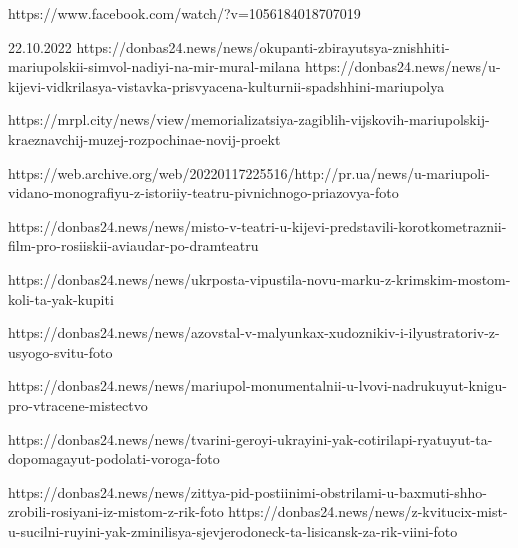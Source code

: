  
 
 
 
 

https://www.facebook.com/watch/?v=1056184018707019

22.10.2022
https://donbas24.news/news/okupanti-zbirayutsya-znishhiti-mariupolskii-simvol-nadiyi-na-mir-mural-milana
https://donbas24.news/news/u-kijevi-vidkrilasya-vistavka-prisvyacena-kulturnii-spadshhini-mariupolya

https://mrpl.city/news/view/memorializatsiya-zagiblih-vijskovih-mariupolskij-kraeznavchij-muzej-rozpochinae-novij-proekt

https://web.archive.org/web/20220117225516/http://pr.ua/news/u-mariupoli-vidano-monografiyu-z-istoriiy-teatru-pivnichnogo-priazovya-foto

https://donbas24.news/news/misto-v-teatri-u-kijevi-predstavili-korotkometraznii-film-pro-rosiiskii-aviaudar-po-dramteatru

https://donbas24.news/news/ukrposta-vipustila-novu-marku-z-krimskim-mostom-koli-ta-yak-kupiti

https://donbas24.news/news/azovstal-v-malyunkax-xudoznikiv-i-ilyustratoriv-z-usyogo-svitu-foto

https://donbas24.news/news/mariupol-monumentalnii-u-lvovi-nadrukuyut-knigu-pro-vtracene-mistectvo

https://donbas24.news/news/tvarini-geroyi-ukrayini-yak-cotirilapi-ryatuyut-ta-dopomagayut-podolati-voroga-foto

https://donbas24.news/news/zittya-pid-postiinimi-obstrilami-u-baxmuti-shho-zrobili-rosiyani-iz-mistom-z-rik-foto
https://donbas24.news/news/z-kvitucix-mist-u-sucilni-ruyini-yak-zminilisya-sjevjerodoneck-ta-lisicansk-za-rik-viini-foto

